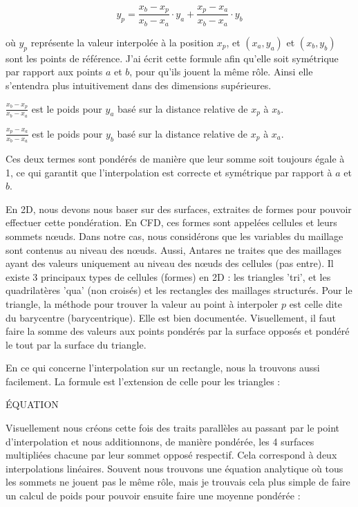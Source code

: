 \[
y_p = \frac{x_b - x_p}{x_b - x_a} \cdot y_a + \frac{x_p - x_a}{x_b - x_a} \cdot y_b
\]

où \( y_p \) représente la valeur interpolée à la position \( x_p \), et \((x_a, y_a)\) et \((x_b, y_b)\) sont les points de référence. J'ai écrit cette formule afin qu'elle soit symétrique par rapport aux points \( a \) et \( b \), pour qu'ils jouent la même rôle. Ainsi elle s'entendra plus intuitivement dans des dimensions supérieures.
\vspace{0.5cm}

        \( \frac{x_b - x_p}{x_b - x_a} \) est le poids pour \( y_a \) basé sur la distance relative de \( x_p \) à \( x_b \).

        \( \frac{x_p - x_a}{x_b - x_a} \) est le poids pour \( y_b \) basé sur la distance relative de \( x_p \) à \( x_a \).\vspace{0.5cm}

Ces deux termes sont pondérés de manière que leur somme soit toujours égale à 1, ce
qui garantit que l'interpolation est correcte et symétrique par rapport à \( a \) et \( b \).\vspace{0.5cm}

En 2D, nous devons nous baser sur des surfaces, extraites de formes pour pouvoir effectuer cette pondération. En CFD, ces formes sont appelées cellules et leurs sommets nœuds. Dans notre cas, nous considérons que les variables du maillage sont contenus au niveau des nœuds. Aussi, Antares ne traites que des maillages ayant des valeurs uniquement au niveau des nœuds des cellules (pas entre).
Il existe 3 principaux types de cellules (formes) en 2D : les triangles 'tri', et les quadrilatères 'qua' (non croisés) et les rectangles des maillages structurés.
Pour le triangle, la méthode pour trouver la valeur au point à interpoler \( p \) est celle dite du barycentre (barycentrique).
Elle est bien documentée. Visuellement, il faut faire la somme des valeurs aux points pondérés par la surface opposés et pondéré le tout par la surface du triangle.

En ce qui concerne l'interpolation sur un rectangle, nous la trouvons aussi facilement. La formule est l'extension de celle pour les triangles :

ÉQUATION

Visuellement nous créons cette fois des traits parallèles au passant par le point d'interpolation et nous additionnons, de manière pondérée, les 4 surfaces multipliées chacune par leur sommet opposé respectif. Cela correspond à deux interpolations linéaires. Souvent nous trouvons une équation analytique où tous les sommets ne jouent pas le même rôle, mais je trouvais cela plus simple de faire un calcul de poids pour pouvoir ensuite faire une moyenne pondérée :


